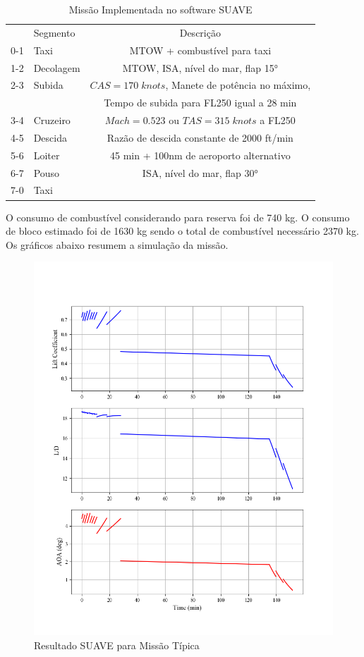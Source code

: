 \begin{table}[H]
\centering
\begin{tabular}{clc}
\toprule
    & Segmento & Descrição \\
0-1 & Taxi & MTOW + combustível para taxi\\
1-2 & Decolagem & MTOW, ISA, nível do mar, flap 15° \\
2-3 & Subida   & $CAS = 170 \; knots$, Manete de potência no máximo, \\
 & & Tempo de subida para FL250 igual a 28 min\\
3-4 & Cruzeiro & $Mach = 0.523$ ou $TAS = 315 \; knots$ a FL250\\
4-5 & Descida  & Razão de descida constante de 2000 ft/min \\
5-6 & Loiter   & 45 min + 100nm de aeroporto alternativo\\
6-7 & Pouso    & ISA, nível do mar, flap 30°\\
7-0 & Taxi     & \\
\bottomrule
\end{tabular}
\caption{Missão Implementada no software SUAVE}
\label{tbl:mission_suave}
\end{table}

O consumo de combustível considerando para reserva foi de 740 kg. O consumo de bloco estimado foi de 1630 kg sendo o total de combustível necessário 2370 kg. Os gráficos abaixo resumem a simulação da missão.

\clearpage

\begin{figure}[H]
\centering
\includegraphics[width=1.\textwidth]{images/parte4/aero0.png}
\caption{Resultado SUAVE para Missão Típica}
\label{fig:aero_mission}
\end{figure}

